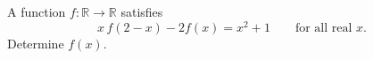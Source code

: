 A function $f:\mathbb R\to\mathbb R$ satisfies
\[x\,f(2-x)-2f(x)=x^2+1\qquad\text{for all real }x.\]
Determine $f(x)$.
